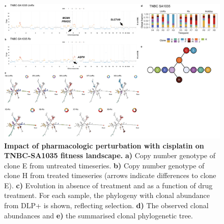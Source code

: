 \begin{figure}
\centering
\includegraphics[width=\textwidth]{Figures/chap4/genePlot1035.png}
\caption[Impact of pharmacologic perturbation with cisplatin on TNBC-SA1035 fitness landscape.]
	{\small
	\textbf{Impact of pharmacologic perturbation with cisplatin on TNBC-SA1035 fitness landscape.}
	    \textbf{a)} Copy number genotype of clone E from untreated timeseries. \textbf{b)} Copy number genotype of clone H from treated timeseries (arrows indicate differences to clone E). \textbf{c)}  Evolution in absence of treatment and as a function of drug treatment. For each sample, the phylogeny with clonal abundance from DLP+ is shown, reflecting selection. \textbf{d)} The observed clonal abundances and \textbf{e)} the summarised clonal phylogenetic tree.}
\label{fig:genotype1035}
\end{figure}

